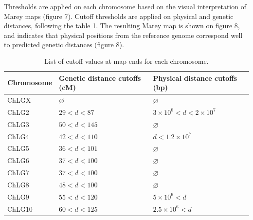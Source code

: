 \documentclass[english, a4paper, 12pt]{article}
\begin{document}
\hfill

Thresholds are applied on each chromosome based on the visual interpretation of Marey maps (figure 7).
Cutoff thresholds are applied on physical and genetic distances, following the table 1. The resulting Marey map is shown on figure 8, and indicates that physical positions from the reference genome correspond well to predicted genetic distances (figure 8).

\hfill

\begin{table}[]
\centering
\caption{\small{List of cutoff values at map ends for each chromosome.}}
\begin{tabular}{l|l|l}
\hline
Chromosome & Genetic distance cutoffs (cM) & Physical distance cutoffs (bp) \\ \hline
ChLGX      & $\varnothing$                 & $\varnothing$                  \\
ChLG2      & $29 < d < 87$                 & $3\times10^6< d <2\times10^7$  \\
ChLG3      & $50 < d < 145$                & $\varnothing$                  \\
ChLG4      & $42< d <110$                  & $d <1.2\times10^7$             \\
ChLG5      & $36< d <101$                  & $\varnothing$                  \\
ChLG6      & $37< d <100$                  & $\varnothing$                  \\
ChLG7      & $37< d <100$                  & $\varnothing$                  \\
ChLG8      & $48< d <100$                  & $\varnothing$                  \\
ChLG9      & $55< d <120$                  & $5\times10^6< d$               \\
ChLG10     & $60< d <125$                  & $2.5\times10^6< d$            
\end{tabular}
\end{table}

\hfill
\end{document}

